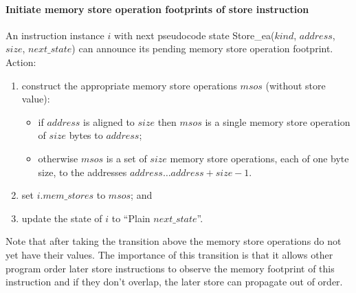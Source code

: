%

\paragraph{Initiate memory store operation footprints of store instruction}\label{omm:hart:announce_mem_write_footprint}
An instruction instance $i$ with next pseudocode state {\sc Store\_ea}($kind$, $address$, $size$, $next\_state$) can announce its pending memory store operation footprint.
Action:
\begin{enumerate}
\item construct the appropriate memory store operations $msos$ (without store value):
  \begin{itemize}
  \item if $address$ is aligned to $size$ then $msos$ is a single memory store operation of $size$ bytes to $address$;
  \item otherwise $msos$ is a set of $size$ memory store operations, each of one byte size, to the addresses $address\ldots address+size-1$.
  \end{itemize}
\item set $i.mem\_stores$ to $msos$; and
\item update the state of $i$ to ``{\sc Plain} $next\_state$''.
\end{enumerate}

\begin{commentary}
Note that after taking the transition above the memory store operations do not yet have their values.
The importance of this transition is that it allows other program order later store instructions to observe the memory footprint of this instruction and if they don't overlap, the later store can propagate out of order.
\end{commentary}


